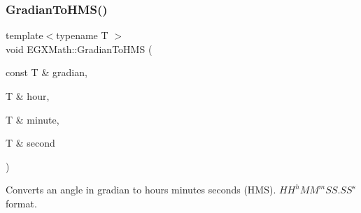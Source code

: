 \subsubsection{\texorpdfstring{Gradian\+To\+H\+M\+S()}{GradianToHMS()}}
{\footnotesize\ttfamily template$<$typename T $>$ \\
void E\+G\+X\+Math\+::\+Gradian\+To\+H\+MS (\begin{DoxyParamCaption}\item[{const T \&}]{gradian,  }\item[{T \&}]{hour,  }\item[{T \&}]{minute,  }\item[{T \&}]{second }\end{DoxyParamCaption})}



Converts an angle in gradian to hours minutes seconds (H\+MS). ${HH}^h{MM}^m{SS.SS}^s$ format. 

